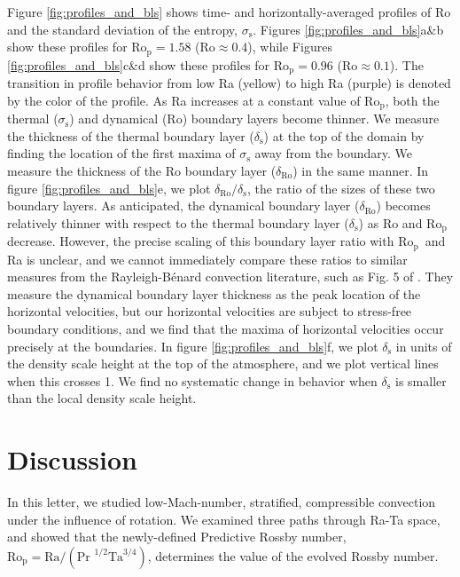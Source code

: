 \documentclass[twocolumn, amsmath, amsfonts, amssymb, trackchanges]{aastex62}
\newcommand{\RB}{Rayleigh-B\'{e}nard }
\newcommand{\pro}{\ensuremath{\text{Ro}_{\text{p}}}}
\begin{document}
Figure \ref{fig:profiles_and_bls} shows time- and horizontally-averaged profiles of
Ro and the standard deviation of the entropy, $\sigma_{\text{s}}$.
Figures \ref{fig:profiles_and_bls}a\&b show these profiles for $\pro=1.58$ ($\text{Ro} \approx 0.4$), while
Figures \ref{fig:profiles_and_bls}c\&d show these profiles for $\pro=0.96$ ($\text{Ro} \approx 0.1$). The transition
in profile behavior from low Ra (yellow) to high Ra (purple) is denoted by the color of the
profile.
As Ra increases at a constant value of
\pro, both the thermal ($\sigma_{\text{s}}$) and dynamical (Ro) boundary layers become thinner. 
We measure the
thickness of the thermal boundary layer ($\delta_{\text{s}}$) at the top of the domain by 
finding the location of the first maxima of $\sigma_{\text{s}}$ away from the boundary.
We measure
the thickness of the Ro boundary layer ($\delta_{\text{Ro}}$) 
in the same manner.
In figure \ref{fig:profiles_and_bls}e, we plot $\delta_{\text{Ro}}/\delta_{\text{s}}$, the ratio
of the sizes of these two boundary layers. As anticipated, the dynamical boundary layer ($\delta_{\text{Ro}}$)
becomes relatively thinner with respect to the thermal boundary layer ($\delta_{\text{s}}$)
as Ro and \pro$\,$ decrease. 
However, the precise scaling of this boundary layer ratio with \pro$\,$ and Ra is unclear, 
and we cannot immediately compare these ratios to similar measures from the \RB convection
literature, such as Fig. 5 of \cite{king&all2013}. They measure the dynamical boundary layer
thickness as the peak location of the horizontal velocities, but our horizontal velocities
are subject to stress-free boundary conditions, and we find that the maxima of horizontal 
velocities occur precisely at the boundaries.
In figure \ref{fig:profiles_and_bls}f, we plot $\delta_\text{s}$ in units of the density
scale height at the top of the atmosphere, and we plot vertical lines when this crosses 1.
We find no systematic change in behavior when $\delta_{\text{s}}$ is smaller than the
local density scale height.

\section{Discussion}
\label{sec:discussion}
In this letter, we studied low-Mach-number, stratified, compressible convection 
under the influence of rotation.
We examined three paths through Ra-Ta space, and showed that the newly-defined 
Predictive Rossby number, $\pro = \text{Ra}/(\text{Pr }^{1/2}\text{Ta}^{3/4})$, determines the value of
the evolved Rossby number.
\end{document}
